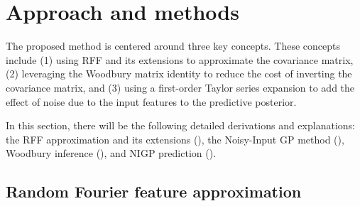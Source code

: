 \documentclass[11pt]{article}
\begin{document}




\section{Approach and methods}
\label{sec:methods}

The proposed method is centered around three key concepts. These concepts include (1) using RFF and its extensions to approximate the covariance matrix, (2) leveraging the Woodbury matrix identity to reduce the cost of inverting the covariance matrix, and (3) using a first-order Taylor series expansion to add the effect of noise due to the input features to the predictive posterior.

In this section, there will be the following detailed derivations and explanations: the RFF approximation and its extensions (), the Noisy-Input GP method (), Woodbury inference (), and NIGP prediction ().

\subsection{Random Fourier feature approximation}
\label{sec:rff}
\end{document}

